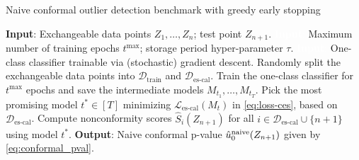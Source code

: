 \begin{algorithm}[H]
    \caption{Naive conformal outlier detection benchmark with greedy early stopping}
    \label{alg:naive-one}
    \begin{algorithmic}[1]
        \STATE \textbf{Input}: Exchangeable data points $Z_1, \ldots, Z_n$; test point $Z_{n+1}$.
        \STATE \textcolor{white}{\textbf{Input}:} Maximum number of training epochs $t^{\text{max}}$; storage period hyper-parameter $\tau$.
        \STATE \textcolor{white}{\textbf{Input}:} One-class classifier trainable via (stochastic) gradient descent.
        \STATE Randomly split the exchangeable data points into $\mathcal{D}_{\text{train}}$ and $\mathcal{D}_{\text{es-cal}}$.
        \STATE Train the one-class classifier for $t^{\text{max}}$ epochs and save the intermediate models $M_{t_1} , \dots, M_{t_T}$.
        \STATE Pick the most promising model $t^* \in [T]$ minimizing $\mathcal{L}_{\text{es-cal}}(M_t)$ in \eqref{eq:loss-ces}, based on $\mathcal{D}_{\text{es-cal}}$.
        \STATE Compute nonconformity scores $\hat{S}_i(Z_{n+1})$ for all $i \in \mathcal{D}_{\text{es-cal}} \cup \{n+1\}$ using model $t^*$.
        \STATE \textbf{Output}: Naive conformal p-value $\hat{u}_0^{\textup{naive}}(Z_{n+1})$ given by \eqref{eq:conformal_pval}.
    \end{algorithmic}
\end{algorithm}

